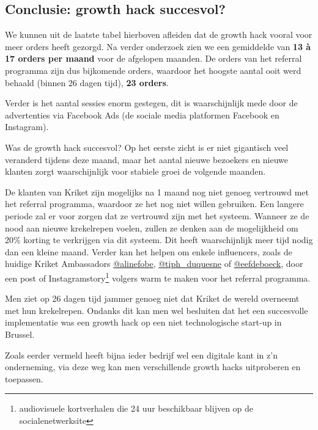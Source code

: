 \subsection{Conclusie: growth hack succesvol?} \label{sec:conclusie-growth-hack-succesvol}
We kunnen uit de laatste tabel hierboven afleiden dat de growth hack vooral voor meer orders heeft gezorgd. Na verder onderzoek zien we een gemiddelde van \textbf{13 à 17 orders per maand} voor de afgelopen maanden. De orders van het referral programma zijn dus bijkomende orders, waardoor het hoogste aantal ooit werd behaald (binnen 26 dagen tijd), \textbf{23 orders}.

Verder is het aantal sessies enorm gestegen, dit is waarschijnlijk mede door de advertenties via Facebook Ads (de sociale media platformen Facebook en Instagram). 

Was de growth hack succesvol? Op het eerste zicht is er niet gigantisch veel veranderd tijdens deze maand, maar het aantal nieuwe bezoekers en nieuwe klanten zorgt waarschijnlijk voor stabiele groei de volgende maanden. 

De klanten van Kriket zijn mogelijks na 1 maand nog niet genoeg vertrouwd met het referral programma, waardoor ze het nog niet willen gebruiken. Een langere periode zal er voor zorgen dat ze vertrouwd zijn met het systeem. Wanneer ze de nood aan nieuwe krekelrepen voelen, zullen ze denken aan de mogelijkheid om 20\% korting te verkrijgen via dit systeem. Dit heeft waarschijnlijk meer tijd nodig dan een kleine maand. Verder kan het helpen om enkele influencers, zoals de huidige Kriket Ambassadors \href{https://www.instagram.com/alinefobe}{@alinefobe}, \href{https://www.instagram.com/tiph_duquesne}{@tiph\_duquesne} of \href{https://www.instagram.com/eefdeboeck}{@eefdeboeck}, door een post of Instagramstory\footnote{audiovisuele kortverhalen die 24 uur beschikbaar blijven op de socialenetwerksite} volgers warm te maken voor het referral programma. 

Men ziet op 26 dagen tijd jammer genoeg niet dat Kriket de wereld overneemt met hun krekelrepen. Ondanks dit kan men wel besluiten dat het een succesvolle implementatie was een growth hack op een niet technologische start-up in Brussel.

Zoals eerder vermeld heeft bijna ieder bedrijf wel een digitale kant in z'n onderneming, via deze weg kan men verschillende growth hacks uitproberen en toepassen.



